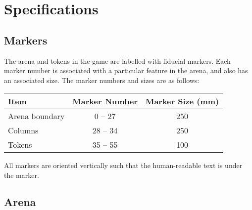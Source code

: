 \section{Specifications}
\label{sec:specs}

\subsection{Markers}
\label{spec:markers}

The arena and tokens in the game are labelled with fiducial
markers. Each marker number is associated with a particular feature in the
arena, and also has an associated size. The marker numbers and sizes are as
follows:

\begin{center}
\begin{tabular}{lcc}
  \toprule
  \textbf{Item} & \textbf{Marker Number} & \textbf{Marker Size (\si{mm})} \\
  \midrule
  Arena boundary & 0 -- 27 & 250 \\
  Columns & 28 -- 34 & 250 \\
  Tokens & 35 -- 55 & 100 \\
  \bottomrule
\end{tabular}
\end{center}

All markers are oriented vertically such that the human-readable text
is under the marker.

\subsection{Arena}
\label{spec:arena}

